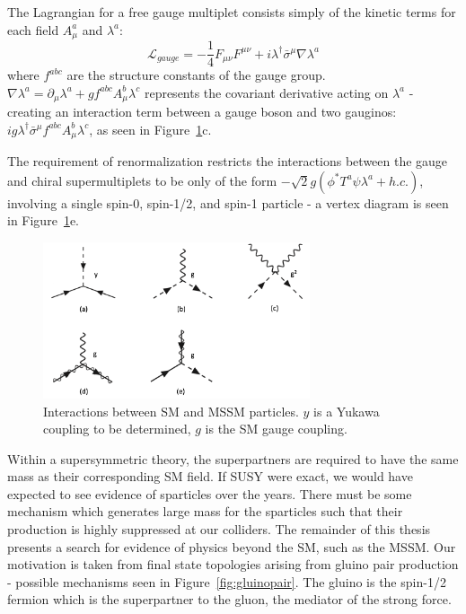 The Lagrangian for a free gauge multiplet consists simply of the kinetic terms for each field $A_{\mu}^{a}$ and $\lambda^{a}$:
\begin{equation}
\mathcal{L}_{gauge} = -\frac{1}{4}F_{\mu\nu}F^{\mu\nu} + i \lambda^{\dagger}\bar{\sigma}^{\mu}\nabla\lambda^{a}
\end{equation}
where $f^{abc}$ are the structure constants of the gauge group. $\nabla\lambda^{a} = \partial_{\mu}\lambda^{a}+gf^{abc}A^{b}_{\mu}\lambda^{c}$ represents the covariant derivative acting on $\lambda^{a}$ - creating an interaction term between a gauge boson and two gauginos: $i g \lambda^{\dagger}\bar{\sigma}^{\mu} f^{abc}A^{b}_{\mu}\lambda^{c}$, as seen in Figure~\ref{fig:mssmfeyn}c.

The requirement of renormalization restricts the interactions between the gauge and chiral supermultiplets to be only of the form $-\sqrt{2}g(\phi^{*}T^{a}\psi\lambda^{a}+h.c.)$, involving a single spin-0, spin-1/2, and spin-1 particle - a vertex diagram is seen in Figure~\ref{fig:mssmfeyn}e.

\begin{figure}[hbp!]
\centering
\includegraphics[width=0.7\textwidth]{figs/mssmfeyn.png}
\caption[Interactions between SM and MSSM particles.]{Interactions between SM and MSSM particles. $y$ is a Yukawa coupling to be determined, $g$ is the SM gauge coupling.}
\label{fig:mssmfeyn}
\end{figure}

Within a supersymmetric theory, the superpartners are required to have the same mass as their corresponding SM field. If SUSY were exact, we would have expected to see evidence of sparticles over the years. There must be some mechanism which generates large mass for the sparticles such that their production is highly suppressed at our colliders. The remainder of this thesis presents a search for evidence of physics beyond the SM, such as the MSSM. Our motivation is taken from final state topologies arising from gluino pair production - possible mechanisms seen in Figure~\ref{fig:gluinopair}. The gluino is the spin-1/2 fermion which is the superpartner to the gluon, the mediator of the strong force.

